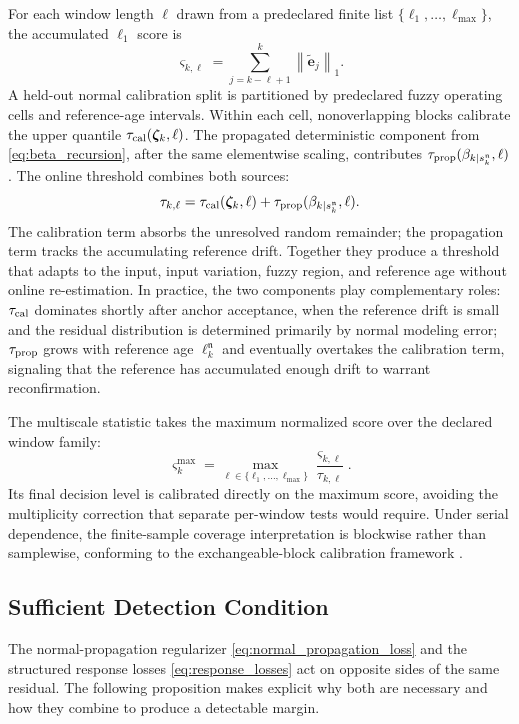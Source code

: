 \documentclass[journal]{IEEEtran}
\newcommand{\norm}[1]{\left\lVert #1\right\rVert}
\newcommand{\1}{\bm 1}
\begin{document}
For each window length $\ell$ drawn from a predeclared finite list
$\{\ell_1,\ldots,\ell_{\max}\}$, the accumulated $\ell_1$ score is
\begin{equation}
\varsigma_{k,\ell}=
\sum_{j=k-\ell+1}^{k}\norm{\widetilde{\bm e}_j}_1.
\label{eq:window_score}
\end{equation}
A held-out normal calibration split is partitioned by predeclared fuzzy
operating cells and reference-age intervals. Within each cell, nonoverlapping
blocks calibrate the upper quantile $\tau_{\rm cal}(\bm\zeta_k,\ell)$. The
propagated deterministic component from \eqref{eq:beta_recursion}, after the
same elementwise scaling, contributes $\tau_{\rm
prop}(\beta_{k\mid s_k^{\mathfrak n}},\ell)$. The online threshold combines
both sources:
\begin{equation}
\tau_{k,\ell}=
\tau_{\rm cal}(\bm\zeta_k,\ell)
+\tau_{\rm prop}(\beta_{k\mid s_k^{\mathfrak n}},\ell).
\label{eq:dynamic_threshold}
\end{equation}
The calibration term absorbs the unresolved random remainder; the propagation
term tracks the accumulating reference drift. Together they produce a
threshold that adapts to the input, input variation, fuzzy region, and
reference age without online re-estimation. In practice, the two components
play complementary roles: $\tau_{\rm cal}$ dominates shortly after anchor
acceptance, when the reference drift is small and the residual distribution is
determined primarily by normal modeling error; $\tau_{\rm prop}$ grows with
reference age $\ell_k^{\mathfrak n}$ and eventually overtakes the calibration
term, signaling that the reference has accumulated enough drift to warrant
reconfirmation.

The multiscale statistic takes the maximum normalized score over the declared
window family:
\begin{equation}
\varsigma_k^{\max}=
\max_{\ell\in\{\ell_1,\ldots,\ell_{\max}\}}
\frac{\varsigma_{k,\ell}}{\tau_{k,\ell}}.
\label{eq:multiscale}
\end{equation}
Its final decision level is calibrated directly on the maximum score, avoiding
the multiplicity correction that separate per-window tests would require.
Under serial dependence, the finite-sample coverage interpretation is
blockwise rather than samplewise, conforming to the exchangeable-block
calibration framework \cite{vovk2005,xu2021}.

\subsection{Sufficient Detection Condition}
The normal-propagation regularizer \eqref{eq:normal_propagation_loss} and the
structured response losses \eqref{eq:response_losses} act on opposite sides of
the same residual. The following proposition makes explicit why both are
necessary and how they combine to produce a detectable margin.
\end{document}
